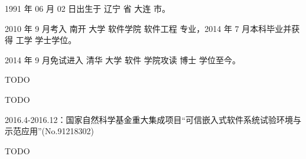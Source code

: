 \begin{resume}


  1991 年 06 月 02 日出生于 辽宁 省 大连 市。

  2010 年 9 月考入 南开 大学 软件学院  软件工程 专业，2014 年 7 月本科毕业并获得 工学 学士学位。

  2014 年 9 月免试进入 清华 大学 软件 学院攻读 博士 学位至今。


  \begin{publications}
    \item TODO
  \end{publications}

  \begin{publications}[before=\publicationskip,after=\publicationskip]
    \item TODO
  \end{publications}


  \begin{achievements}
  	\item 2016.4-2016.12：国家自然科学基金重大集成项目“可信嵌入式软件系统试验环境与示范应用”(No.91218302)
  \end{achievements}

  \begin{achievements}
    \item TODO
  \end{achievements}

\end{resume}
